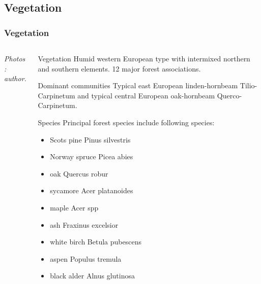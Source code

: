 \documentclass[pdflatex,compress,8pt,
	xcolor={dvipsnames,dvipsnames,svgnames,x11names,table},
	hyperref={colorlinks = true,
	breaklinks = true, urlcolor = NavyBlue, breaklinks = true}]{beamer}
\begin{document}
\subsection{Vegetation}
\begin{frame}\frametitle{Vegetation}
\begin{minipage}[0.4\textheight]{\textwidth}
\begin{columns}[T]
\begin{column}{0.4\textwidth}
\vspace{2em}
\begin{figure}[H]
	\centering
			\vspace{2mm}
			\vspace{2mm}
\end{figure}
\small{\emph{Photos: author.}}
\end{column}

\begin{column}{0.6\textwidth}
\vspace{4em} 
\begin{block}{Vegetation}
Humid western European type with intermixed northern and southern elements. 12 major forest associations. 
\end{block}

\begin{alertblock}{Dominant communities}
Typical east European linden-hornbeam Tilio-Carpinetum and typical central European oak-hornbeam Querco-Carpinetum.
\end{alertblock}

\begin{examples}{Species}
Principal forest species include following species:
\end{examples}
\begin{itemize}
	\item Scots pine Pinus silvestris
	\item Norway spruce Picea abies
	\item oak Quercus robur
	\item sycamore Acer platanoides
	\item maple Acer spp
	\item ash Fraxinus excelsior
	\item white birch Betula pubescens
	\item aspen Populus tremula
	\item black alder Alnus glutinosa
\end{itemize}

\end{column}
\end{columns}
\end{minipage}
\end{frame}
\end{document}
